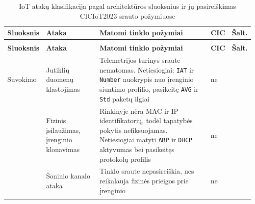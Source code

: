 \begingroup
\footnotesize
\setlength{\tabcolsep}{3pt}
\sloppy
\begin{xltabular}{\textwidth}{@{}
  >{\raggedright\arraybackslash}p{1.5cm}
  >{\raggedright\arraybackslash}p{3.3cm}
  >{\raggedright\arraybackslash}X
  >{\centering\arraybackslash}p{0.8cm}
  >{\centering\arraybackslash}p{1.15cm}@{}}
\caption{IoT atakų klasifikacija pagal architektūros sluoksnius ir jų
         pasireiškimas CICIoT2023 srauto požymiuose}
\label{tab:atakos} \\
\toprule
\textbf{Sluoksnis} & \textbf{Ataka} & \textbf{Matomi tinklo požymiai}
  & \textbf{CIC} & \textbf{Šalt.} \\
\midrule
\endfirsthead
{} \\
\toprule
\textbf{Sluoksnis} & \textbf{Ataka} & \textbf{Matomi tinklo požymiai}
  & \textbf{CIC} & \textbf{Šalt.} \\
\midrule
\endhead
\bottomrule
\endlastfoot

Suvokimo
  & Jutiklių duomenų klastojimas
  & Telemetrijos turinys sraute nematomas. Netiesiogiai: \texttt{IAT}
    ir \texttt{Number} nuokrypis nuo įrenginio siuntimo profilio,
    pasikeitę \texttt{AVG} ir \texttt{Std} paketų ilgiai
  & ne & \cite{krishna2021taxonomy,sasi2024attacks} \\
\addlinespace
  & Fizinis įsilaužimas, įrenginio klonavimas
  & Rinkinyje nėra MAC ir IP identifikatorių, todėl tapatybės pokytis
    nefiksuojamas. Netiesiogiai matyti \texttt{ARP} ir \texttt{DHCP}
    aktyvumas bei pasikeitęs protokolų profilis
  & ne & \cite{krishna2021taxonomy} \\
\addlinespace
  & Šoninio kanalo ataka
  & Tinklo sraute nepasireiškia, nes reikalauja fizinės prieigos prie
    įrenginio
  & ne & \cite{krishna2021taxonomy,fei2023systematic} \\
\addlinespace[4pt]


\end{xltabular}
